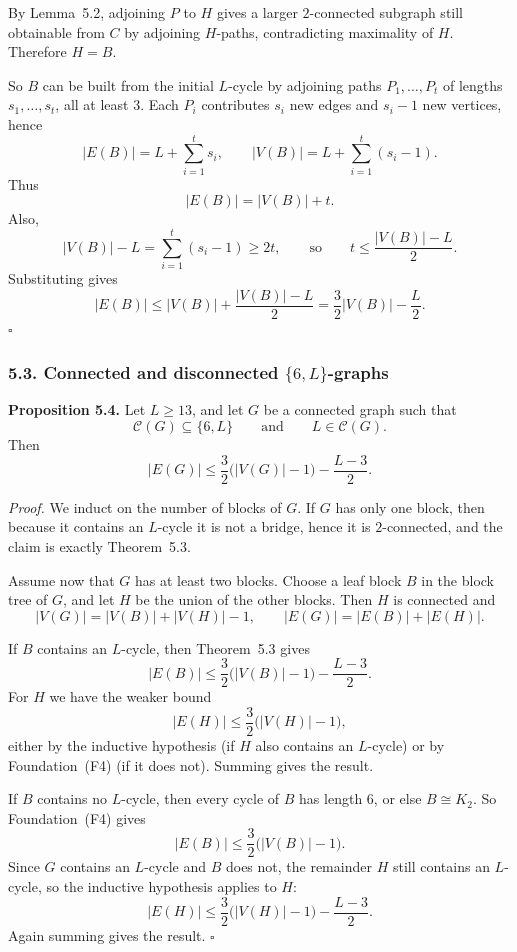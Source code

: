 By Lemma~5.2, adjoining $P$ to $H$ gives a larger $2$-connected subgraph still obtainable from $C$ by adjoining $H$-paths, contradicting maximality of $H$.
Therefore $H=B$.

So $B$ can be built from the initial $L$-cycle by adjoining paths $P_1,\dots,P_t$ of lengths $s_1,\dots,s_t$, all at least $3$.
Each $P_i$ contributes $s_i$ new edges and $s_i-1$ new vertices, hence
\[
|E(B)|=L+\sum_{i=1}^t s_i,
\qquad
|V(B)|=L+\sum_{i=1}^t (s_i-1).
\]
Thus
\[
|E(B)|=|V(B)|+t.
\]
Also,
\[
|V(B)|-L=\sum_{i=1}^t (s_i-1)\ge 2t,
\qquad\text{so}\qquad
t\le \frac{|V(B)|-L}{2}.
\]
Substituting gives
\[
|E(B)|\le |V(B)|+\frac{|V(B)|-L}{2}=\frac32|V(B)|-\frac L2.
\]
\hfill$\square$

\subsubsection*{5.3. Connected and disconnected $\{6,L\}$-graphs}

\textbf{Proposition 5.4.}
Let $L\ge 13$, and let $G$ be a connected graph such that
\[
\mathcal C(G)\subseteq\{6,L\}
\qquad\text{and}\qquad
L\in\mathcal C(G).
\]
Then
\[
|E(G)|\le \frac32\bigl(|V(G)|-1\bigr)-\frac{L-3}{2}.
\]

\medskip
\textit{Proof.}
We induct on the number of blocks of $G$.
If $G$ has only one block, then because it contains an $L$-cycle it is not a bridge, hence it is $2$-connected, and the claim is exactly Theorem~5.3.

Assume now that $G$ has at least two blocks.
Choose a leaf block $B$ in the block tree of $G$, and let $H$ be the union of the other blocks.
Then $H$ is connected and
\[
|V(G)|=|V(B)|+|V(H)|-1,
\qquad
|E(G)|=|E(B)|+|E(H)|.
\]

If $B$ contains an $L$-cycle, then Theorem~5.3 gives
\[
|E(B)|\le \frac32\bigl(|V(B)|-1\bigr)-\frac{L-3}{2}.
\]
For $H$ we have the weaker bound
\[
|E(H)|\le \frac32\bigl(|V(H)|-1\bigr),
\]
either by the inductive hypothesis (if $H$ also contains an $L$-cycle) or by Foundation~(F4) (if it does not).
Summing gives the result.

If $B$ contains no $L$-cycle, then every cycle of $B$ has length $6$, or else $B\cong K_2$.
So Foundation~(F4) gives
\[
|E(B)|\le \frac32\bigl(|V(B)|-1\bigr).
\]
Since $G$ contains an $L$-cycle and $B$ does not, the remainder $H$ still contains an $L$-cycle, so the inductive hypothesis applies to $H$:
\[
|E(H)|\le \frac32\bigl(|V(H)|-1\bigr)-\frac{L-3}{2}.
\]
Again summing gives the result.
\hfill$\square$

